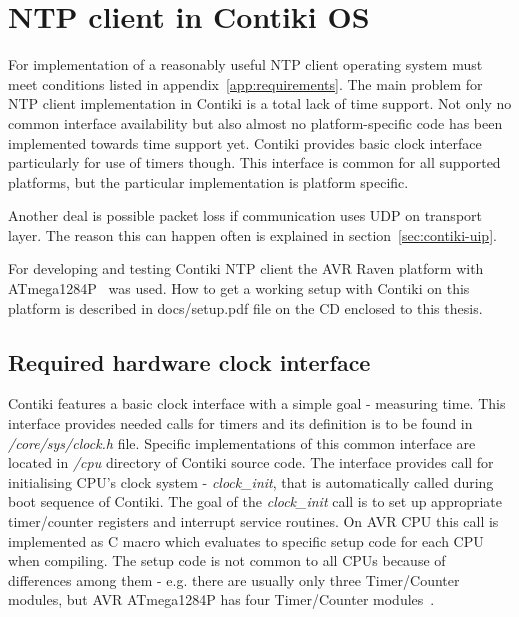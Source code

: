 
\chapter{NTP client in Contiki OS}

For implementation of a reasonably useful NTP client
operating system must meet conditions listed in appendix~\ref{app:requirements}.
The main problem for NTP client implementation in Contiki is a total
lack of time support.
Not only no common interface availability but also
almost no platform-specific code has been implemented towards time support yet.
Contiki provides basic clock interface particularly for use of timers though.
This interface is common for all supported platforms,
but the particular implementation is platform specific.

Another deal is possible packet loss if communication uses UDP on transport layer.
The reason this can happen often is explained in section~\ref{sec:contiki-uip}.

For developing and testing Contiki NTP client the AVR Raven platform with ATmega1284P~\cite{avr-datasheet} was used.
How to get a working setup with Contiki on this platform is described in
docs/setup.pdf file on the CD enclosed to this thesis.

\section{Required hardware clock interface}
Contiki features a basic clock interface with a simple goal - measuring time.
This interface provides needed calls for timers and its definition is to be found in {\it{/core/sys/clock.h}} file.
Specific implementations of this common interface are located in {\it{/cpu}} directory of Contiki source code.
The interface provides call for initialising CPU's clock system - {\it{clock\_init}}, that is automatically called during
boot sequence of Contiki.
The goal of the {\it{clock\_init}} call is to set up
appropriate timer/counter registers and interrupt service routines.
On AVR CPU this call is implemented as C macro which evaluates to specific setup code for each CPU
when compiling.
The setup code is not common to all CPUs because of differences among them - e.g. there are usually
only three Timer/Counter modules, but AVR ATmega1284P has four Timer/Counter modules~\cite{avr-datasheet}.

